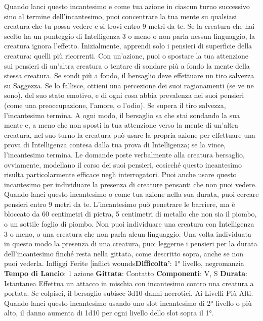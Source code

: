 \begin{multicols}{2}
Quando lanci questo incantesimo e come tua azione in
ciascun turno successivo sino al termine
dell’incantesimo, puoi concentrare la tua mente su
qualsiasi creatura che tu possa vedere e si trovi entro 9
metri da te. Se la creatura che hai scelto ha un
punteggio di Intelligenza 3 o meno o non parla nessun
linguaggio, la creatura ignora l’effetto.
Inizialmente, apprendi solo i pensieri di superficie della
creatura: quelli più ricorrenti. Con un’azione, puoi o
spostare la tua attenzione sui pensieri di un’altra
creatura o tentare di sondare più a fondo la mente della
stessa creatura. Se sondi più a fondo, il bersaglio deve
effettuare un tiro salvezza su Saggezza. Se lo fallisce,
ottieni una percezione dei suoi ragionamenti (se ve ne
sono), del suo stato emotivo, e di ogni cosa abbia
prevalenza nei suoi pensieri (come una
preoccupazione, l’amore, o l’odio). Se supera il tiro
salvezza, l’incantesimo termina. A ogni modo, il
bersaglio sa che stai sondando la sua mente e, a meno
che non sposti la tua attenzione verso la mente di
un’altra creatura, nel suo turno la creatura può usare la
propria azione per effettuare una prova di Intelligenza
contesa dalla tua prova di Intelligenza; se la vince,
l’incantesimo termina.
Le domande poste verbalmente alla creatura bersaglio,
ovviamente, modellano il corso dei suoi pensieri,
cosicché questo incantesimo risulta particolarmente
efficace negli interrogatori.
Puoi anche usare questo incantesimo per individuare la
presenza di creature pensanti che non puoi vedere.
Quando lanci questo incantesimo o come tua azione
nella sua durata, puoi cercare pensieri entro 9 metri da
te. L’incantesimo può penetrare le barriere, ma è
bloccato da 60 centimetri di pietra, 5 centimetri di
metallo che non sia il piombo, o un sottile foglio di
piombo. Non puoi individuare una creatura con
Intelligenza 3 o meno, o una creatura che non parla
alcun linguaggio.
Una volta individuata in questo modo la presenza di
una creatura, puoi leggerne i pensieri per la durata
dell’incantesimo finché resta nella gittata, come
descritto sopra, anche se non puoi vederla.
Infliggi Ferite
[inflict wounds\textbf{Difficolta'}:
1° livello, negromanzia
\textbf{Tempo di Lancio}: 1 azione
\textbf{Gittata}: Contatto
\textbf{Componenti}: V, S
\textbf{Durata}: Istantanea
Effettua un attacco in mischia con incantesimo contro
una creatura a portata. Se colpisci, il bersaglio subisce
3d10 danni necrotici.
Ai Livelli Più Alti. Quando lanci questo incantesimo
usando uno slot incantesimo di 2° livello o più alto, il
danno aumenta di 1d10 per ogni livello dello slot sopra
il 1°.

\end{multicols}
